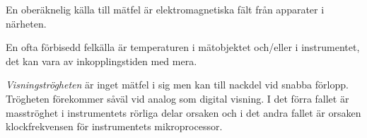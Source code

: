 En oberäknelig källa till mätfel är elektromagnetiska fält från
apparater i närheten.

En ofta förbisedd felkälla är temperaturen i mätobjektet och/eller i
instrumentet, det kan vara av inkopplingstiden med mera.

\emph{Visningströgheten} är inget mätfel i sig men kan till nackdel
vid snabba förlopp.
Trögheten förekommer såväl vid analog som digital visning.
I det förra fallet är masströghet i instrumentets rörliga delar orsaken och i
det andra fallet är orsaken klockfrekvensen för instrumentets mikroprocessor.
